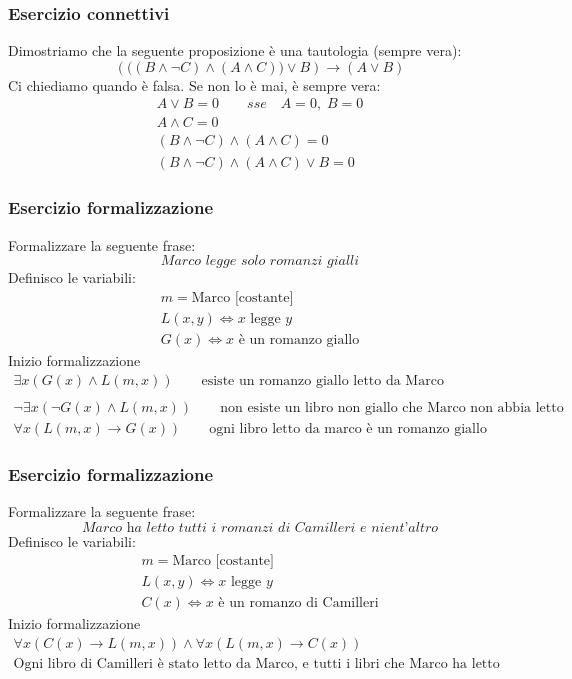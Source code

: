 \documentclass[italian]{article}
\begin{document}
\subsubsection{Esercizio connettivi}
Dimostriamo che la seguente proposizione è una tautologia (sempre vera):
\[
	\left(\bigr((B \land \lnot C) \land (A \land C)\bigr)\lor B\right) \to (A \lor B)
\]
Ci chiediamo quando è falsa. Se non lo è mai, è sempre vera:
\begin{gather*}
	A \lor B = 0 \qquad \textit{sse} \quad A=0 ,\; B=0 \\
	A \land C = 0 \\
	(B \land \lnot C) \land (A \land C) = 0\\
	(B \land \lnot C) \land (A \land C) \lor B =0
\end{gather*}
\pagebreak
\subsubsection{Esercizio formalizzazione}
Formalizzare la seguente frase:
\[
	\textit{Marco legge solo romanzi gialli}
\]
Definisco le variabili:
\begin{gather*}
	m = \text{Marco [costante]} \\
	L(x,y) \Leftrightarrow \text{$x$ legge $y$} \\
	G(x) \Leftrightarrow \text{$x$ è un romanzo giallo}
\end{gather*}
Inizio formalizzazione
\begin{gather*}
	\exists x(G(x) \land L(m,x)) \qquad \text{esiste un romanzo giallo letto da Marco}\\\\
	\lnot \exists x(\lnot G(x) \land L(m,x)) \qquad \text{non esiste un libro non giallo che Marco non abbia letto} \\
	\forall x(L(m,x) \to G(x)) \qquad \text{ogni libro letto da marco è un romanzo giallo}
\end{gather*}

\subsubsection{Esercizio formalizzazione}
Formalizzare la seguente frase:
\[
	\textit{Marco ha letto tutti i romanzi di Camilleri e nient'altro}
\]
Definisco le variabili:
\begin{gather*}
	m = \text{Marco [costante]} \\
	L(x,y) \Leftrightarrow \text{$x$ legge $y$} \\
	C(x) \Leftrightarrow \text{$x$ è un romanzo di Camilleri}
\end{gather*}
Inizio formalizzazione
\begin{gather*}
	\forall x(C(x) \to L(m,x)) \land \forall x(L(m,x) \to C(x))\\
	\text{Ogni libro di Camilleri è stato letto da Marco, e tutti i libri che Marco ha letto sono di Camilleri }
\end{gather*}
\end{document}
